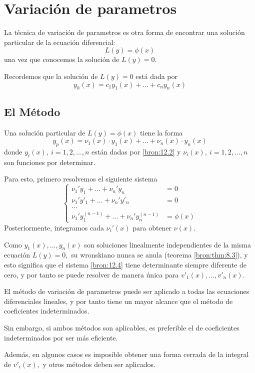  \section{Variaci\'on de parametros}


La t\'ecnica de variaci\'on de parametros es otra forma de encontrar una soluci\'on particular de la ecuaci\'on diferencial:
\[
	\label{bron:12.1}
	L(y)=\phi(x)
\]
una vez que conocemos la soluci\'on de $L(y)=0.$



Recordemos que la soluci\'on de $L(y)=0$ está dada por
\[
	\label{bron:12.2}
	y_{h}(x)=c_{1}y_{1}(x)+...+c_{n}y_{n}(x)
\]



\subsection{El M\'etodo}


Una soluci\'on particular de $L(y)=\phi(x)$ tiene la forma
\[
	\label{bron:12.3}
	y_{p}(x)=\nu_{1}(x)\cdot y_{1}(x)+...+\nu_{n}(x) \cdot y_{n}(x)
\]
donde $y_{i}(x), \ i=1,2,...,n$ están dadas por \eqref{bron:12.2} y $\nu_{i}(x), \ i=1,2,...,n$ son funciones por determinar.



Para esto, primero resolvemos el siguiente sistema
\[
	\label{bron:12.4}
	\begin{cases}
		\nu_{1}'y_{1}+...+\nu_{n}'y_{n}&=0\\
		\nu_{1}'y'_{1}+...+\nu_{n}'y'_{n}&=0\\
		\ldots & \\
		\nu_{1}'y^{(n-1)}_{1}+...+\nu_{n}'y^{(n-1)}_{n}&=\phi(x)
	\end{cases}
\]
Posteriormente, integramos cada $\nu_{i}'(x)$ para obtener $\nu(x).$



Como $y_{1}(x),...,y_{n}(x)$ son soluciones linealmente independientes de la misma ecuaci\'on $L(y)=0,$ su wronskiano nunca se anula (teorema \ref{bron:thm:8.3}), y esto significa que el sistema \eqref{bron:12.4} tiene determinante siempre diferente de cero, y por tanto se puede resolver de manera única para $v'_{1}(x),...,v'_{n}(x).$



\begin{observacion}
	El m\'etodo de variaci\'on de parametros puede ser aplicado a todas las ecuaciones diferenciales lineales, y por tanto tiene un mayor alcance que el m\'etodo de coeficientes indeterminados.
	
	Sin embargo, si ambos m\'etodos son aplicables, es preferible el de coeficientes indeterminados por ser más eficiente.
	
	Además, en algunos casos es imposible obtener una forma cerrada de la integral de $v'_{i}(x),$ y otros m\'etodos deben ser aplicados.
\end{observacion}



